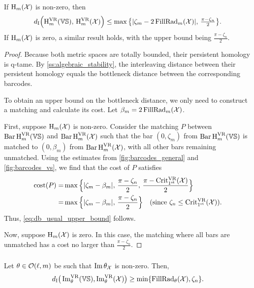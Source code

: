 \medskip\lemma
If \( \opH_m(\cX) \) is non-zero, then
\begin{equation}\label{eq:db_usual_upper_bound}
    \di\Big(\rH^{\VR}_{m}(\VS),\, \rH^{\VR}_{m}(\cX)\Big) 
	\leq \max\big\{|\zeta_m  - 2\firstdeath{m}{\cX} |,\, \tfrac{\pi - \zeta_n}{2}\big\}.
\end{equation}
If \( \opH_m(\cX) \) is zero, a similar result holds, with the upper bound being $\tfrac{\pi - \zeta_n}{2}$.

\begin{proof}
    Because both metric spaces are totally bounded, their persistent homology is q-tame. 
    By \cref{ss:algebraic_stability}, the interleaving distance between their persistent homology equals the bottleneck distance between the corresponding barcodes.

    To obtain an upper bound on the bottleneck distance, we only need to construct a matching and calculate its cost. Let \( \beta_m = 2\firstdeath{m}{\cX} \).

    First, suppose \( \opH_m(\cX) \) is non-zero. 
    Consider the matching \( P \) between \( \Hbarc[\field]{m}{\VS} \) and \( \Hbarc[\field]{m}{\cX} \) such that the bar \( (0, \zeta_m) \) from \( \Hbarc[\field]{m}{\VS} \) is matched to \( (0, \beta_m) \) from \( \Hbarc[\field]{m}{\cX} \), with all other bars remaining unmatched. Using the estimates from \cref{fig:barcodes_general} and \cref{fig:barcodes_vs}, we find that the cost of \( P \) satisfies
    \begin{align*}  
        \cost(P)  
        = & \max\Big\{|\zeta_m - \beta_m|,\, \frac{\pi - \zeta_n}{2},\, \frac{\pi - \crit(\cX)}{2}\Big\} \\
        = & \max\Big\{|\zeta_m - \beta_m|,\, \frac{\pi - \zeta_n}{2}\Big\} \quad \text{(since \( \zeta_n \leq \crit(\cX) \))}.
    \end{align*}  
    Thus, \cref{eq:db_usual_upper_bound} follows.
    
    Now, suppose \( \opH_m(\cX) \) is zero. In this case, the matching where all bars are unmatched has a cost no larger than \( \frac{\pi - \zeta_n}{2}\).
\end{proof}

\subsubsection{}\label{sss:db_theta_lower_bound}

\medskip\lemma
Let $\theta \in \cO(\ell, m)$ be such that $\img \theta_\cX$ is non-zero.
Then,
\begin{equation}\label{eq:db_theta_lower_bound}
	\di\big(\img^{\VR}_{\theta}(\VS), \img^{\VR}_{\theta}(\cX)\big)
	\geq \min\{\firstdeath{\theta}{\cX}, \zeta_n\}. %
\end{equation}


